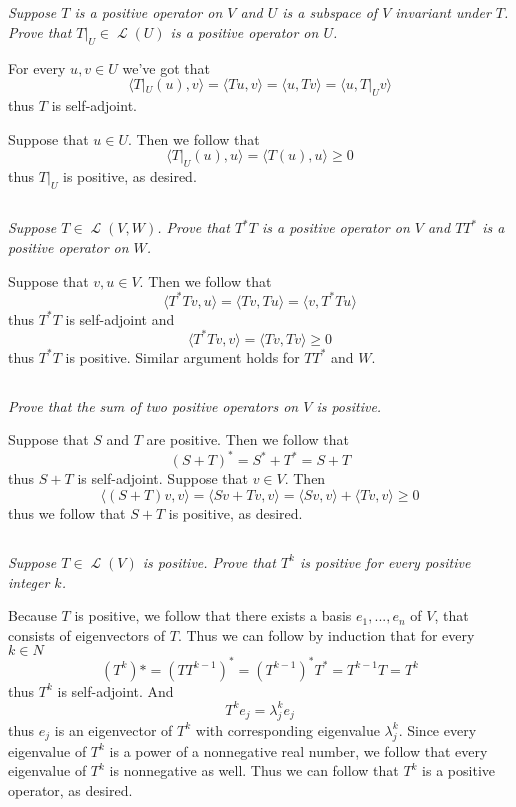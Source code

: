 \documentclass[11pt,oneside,titlepage]{book}
\DeclareMathOperator \map {\mathcal {L}}
\newcommand{\eangle}[1]{\langle #1 \rangle}
\begin{document}
\subsection{}

\textit{Suppose $T$ is a positive operator on $V$ and $U$ is a subspace of $V$ invariant under
  $T$. Prove that $T|_U \in \map(U)$ is a positive operator on $U$.}

For every $u, v \in U$ we've got that 
$$\eangle{T|_U(u), v} = \eangle{Tu, v} = \eangle{u, Tv} = \eangle{u, T|_Uv}$$
thus $T$ is self-adjoint.

Suppose that $u \in U$. Then we follow that
$$\eangle{T|_U(u), u} = \eangle{T(u), u} \geq 0$$
thus $T|_U$ is positive, as desired.

\subsection{}

\textit{Suppose $T \in \map(V, W)$. Prove that $T^* T$ is a positive operator on $V$ and
  $T T^*$ is a positive operator on $W$.}

Suppose that $v, u \in V$. Then we follow that
$$\eangle{T^* Tv, u} = \eangle{Tv, Tu} = \eangle{v, T^* T u}$$
thus $T^* T$ is self-adjoint and 
$$\eangle{T^* Tv, v} = \eangle{Tv, Tv} \geq 0$$
thus $T^* T$ is positive. Similar argument holds for $TT^*$ and $W$.

\subsection{}

\textit{Prove that the sum of two positive operators on $V$ is positive.}

Suppose that $S$ and $T$ are positive. Then we follow that
$$(S + T)^* = S^* + T^* = S + T$$
thus $S + T$ is self-adjoint. Suppose that $v \in V$. Then
$$\eangle{(S + T)v, v} = \eangle{Sv + Tv, v} = \eangle{Sv, v} + \eangle{Tv, v} \geq 0$$
thus we follow that $S + T$ is positive, as desired.

\subsection{}

\textit{Suppose $T \in \map(V)$ is positive. Prove that $T^k$ is positive for every
  positive integer $k$.}

Because $T$ is positive, we follow that there exists a basis $e_1, ..., e_n$ of $V$,
that consists of eigenvectors of $T$. Thus we can follow by induction that for every $k \in N$
$$(T^k)* = (T T^{k - 1})^* = (T^{k - 1})^* T^* = T^{k - 1} T = T^k$$
thus $T^k$ is self-adjoint. And
$$T^k e_j = \lambda_j^k e_j$$
thus $e_j$ is an eigenvector of $T^k$ with corresponding eigenvalue $\lambda_j^k$. Since
every eigenvalue of $T^k$ is a power of a nonnegative real number, we follow that
every eigenvalue of $T^k$ is nonnegative as well.  Thus we can follow that $T^k$ is a
positive operator, as desired.
\end{document}
